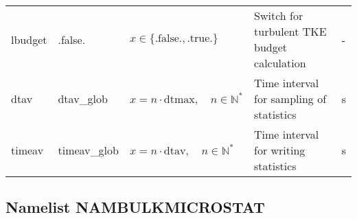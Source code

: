 \documentclass[twoside,11pt,fleqn,a4paper,english,openright]{report}
\begin{document}
\begin{center}
  \tablelasttail{
        &&&&\\\hline
  }
\begin{supertabular}{|l|p{2cm}|p{4cm}|p{6cm}|l|}
  lbudget	& .false.	& $x\in\{\text{.false.},\text{.true.}\}$		& Switch for turbulent TKE budget calculation	& -\\
  dtav		& dtav\_glob	& $x = n \cdot \text{dtmax}, \quad n \in \mathbb{N}^*$	& Time interval for sampling of statistics	& s\\
  timeav	& timeav\_glob	& $x = n \cdot \text{dtav}, \quad n \in \mathbb{N}^*$	& Time interval for writing statistics		& s\\
\end{supertabular}
\end{center}

\subsection{Namelist NAMBULKMICROSTAT}\label{par:bulkmicrostat}
\end{document}
